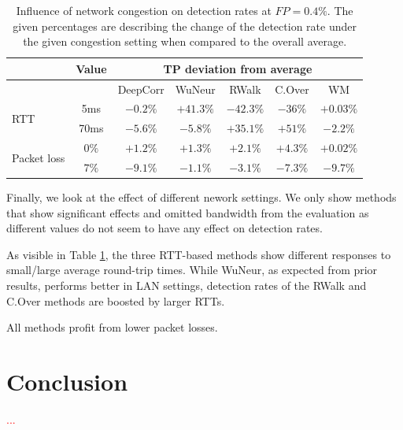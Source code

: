 \documentclass[runningheads]{llncs}\usepackage[]{graphicx}\usepackage[]{color}
\begin{document}
\begin{table}
\centering
\begin{tabular}{l|c|c|c|c|c|c}
& Value & \multicolumn{5}{c}{TP deviation from average}\\ \hline
 & &DeepCorr & WuNeur & RWalk& C.Over & WM \\ \hline
\multirow{2}{*}{RTT} & 5ms& $-0.2\%$ & $+41.3\%$& $-42.3\%$ & $-36\%$ & $+0.03\%$ \\ \cline{2-7}
 & 70ms  & $-5.6\%$ & $-5.8\%$& $+35.1\%$ & $+51\%$& $-2.2\%$\\ \hline

\multirow{2}{*}{Packet loss} & $0\%$ & $+1.2\%$&  $+1.3\%$ & $+2.1\%$ & $+4.3\%$ & $+0.02\%$\\ \cline{2-7}
 & $7\%$  & $-9.1\%$& $-1.1\%$ & $-3.1\%$ & $-7.3\%$ & $-9.7\%$\\ \hline

\end{tabular}
\caption{Influence of network congestion on detection rates at $FP=0.4\%$. The given percentages are describing the change of the detection rate under the given congestion setting when compared to the overall average.}\label{Tab:Congestion}
\end{table}

Finally, we look at the effect of different nework settings. We only show methods that show significant effects and omitted bandwidth from the evaluation as different values do not seem to have any effect on detection rates.

As visible in Table \ref{Tab:Congestion}, the three RTT-based methods show different responses to small/large average round-trip times. While WuNeur, as expected from prior results, performs better in LAN settings, detection rates of the RWalk and C.Over methods are boosted by larger RTTs. 

All methods profit from lower packet losses.


\section{Conclusion}

\textcolor{red}{...}

%



\appendix




 
\end{document}

